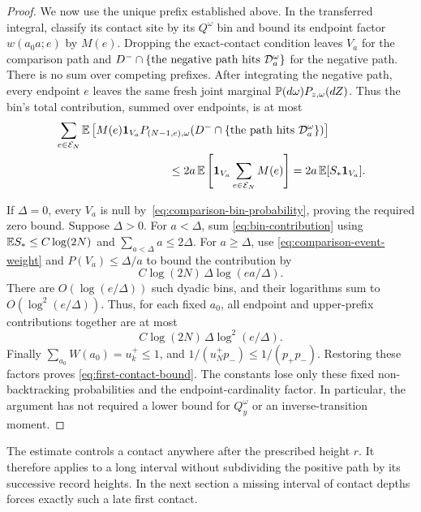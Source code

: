 \begin{proof}
We now use the unique prefix established above.  In the transferred
integral, classify its contact site by its $Q^\omega$ bin and bound its
endpoint factor $w(a_0a;e)$ by $M(e)$.  Dropping the exact-contact
condition leaves $V_a$ for the comparison path and
$D^-\cap\{\hbox{the negative path hits }\mathcal D_a^\omega\}$
for the negative path.  There is no sum over competing prefixes.
After integrating the negative path, every endpoint $e$ leaves the same
fresh joint marginal $\mathbb P(d\omega)P_{z,\omega}(dZ)$.  Thus the bin's
total contribution, summed over endpoints, is at most
\begin{equation}\label{eq:bin-contribution}
 \begin{split}
 &\sum_{e\in\mathcal E_N}\EE\left[
     M(e)\1_{V_a}
     P_{(N-1,e),\omega}
     (D^-\cap\{\hbox{the path hits }\mathcal D_a^\omega\})\right]\\
 &\hspace{35mm}\le 2a\,\EE\left[\1_{V_a}\sum_{e\in\mathcal E_N}M(e)\right]
  =2a\,\EE[S_*\1_{V_a}].
 \end{split}
\end{equation}

If $\Delta=0$, every $V_a$ is null
by~\eqref{eq:comparison-bin-probability}, proving the required zero
bound.  Suppose $\Delta>0$.  For $a<\Delta$, sum
\eqref{eq:bin-contribution} using $\mathbb E S_*\le C\log(2N)$ and
$\sum_{a<\Delta}a\le2\Delta$.  For $a\ge\Delta$, use
\eqref{eq:comparison-event-weight} and
$P(V_a)\le\Delta/a$ to bound the contribution by
\[
 C\log(2N)\,\Delta\log(ea/\Delta).
\]
There are $O(\log(e/\Delta))$ such dyadic bins, and their logarithms
sum to $O(\log^2(e/\Delta))$.  Thus, for each fixed $a_0$, all endpoint
and upper-prefix contributions together are at most
\[
 C\log(2N)\,\Delta\log^2(e/\Delta).
\]
Finally $\sum_{a_0}W(a_0)=u_k^+\le1$, and
$1/(u_N^+p_-)\le1/(p_+p_-)$.  Restoring these factors proves
\eqref{eq:first-contact-bound}.  The constants lose only these fixed
non-backtracking probabilities and the endpoint-cardinality factor.
In particular, the argument has not required a lower bound for
$Q_y^\omega$ or an inverse-transition moment.
\end{proof}

The estimate controls a contact anywhere after the prescribed height
$r$.  It therefore applies to a long interval without subdividing the
positive path by its successive record heights.  In the next section a
missing interval of contact depths forces exactly such a late first
contact.
